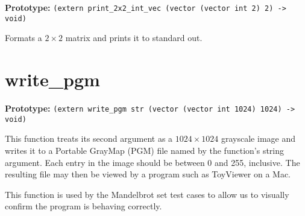\documentclass{book}
\begin{document}
\textbf{Prototype:} \lstinline{(extern print_2x2_int_vec (vector (vector int 2) 2) -> void)}

Formats a $2 \times 2$ matrix and prints it to standard out.


\section{write\_pgm}

\textbf{Prototype:} \lstinline{(extern write_pgm str (vector (vector int 1024) 1024) -> void)}

This function treats its second argument as a $1024 \times 1024$
grayscale image and writes it to a Portable GrayMap (PGM) file named
by the function's string argument. Each entry in the image should be
between 0 and 255, inclusive. The resulting file may then be viewed by
a program such as ToyViewer on a Mac.

This function is used by the Mandelbrot set test cases to allow us to
visually confirm the program is behaving correctly.
\end{document}
